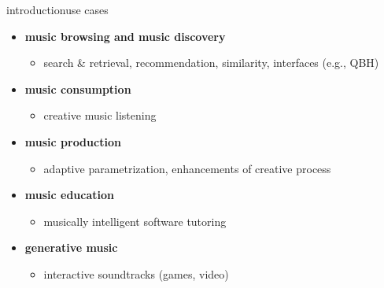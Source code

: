        \begin{frame}{introduction}{use cases}
            \begin{itemize}
                \item	\textbf{music browsing and music discovery} 
                    \begin{itemize}
                        \item   search \& retrieval, recommendation, similarity, interfaces (e.g., QBH)
                    \end{itemize}
                \smallskip
                \item<2->	\textbf{music consumption} 
                    \begin{itemize}
                        \item   creative music listening
                    \end{itemize}
                \smallskip
                \item<3->	 \textbf{music production}
                    \begin{itemize}
                        \item   adaptive parametrization, enhancements of creative process
                    \end{itemize}
                \smallskip
                \item<4->	\textbf{music education}
                    \begin{itemize}
                        \item   musically intelligent software tutoring
                    \end{itemize}
                \smallskip
                \item<5->	\textbf{generative music}
                    \begin{itemize}
                        \item   interactive soundtracks (games, video)
                    \end{itemize}
            \end{itemize}
        \end{frame}
         
